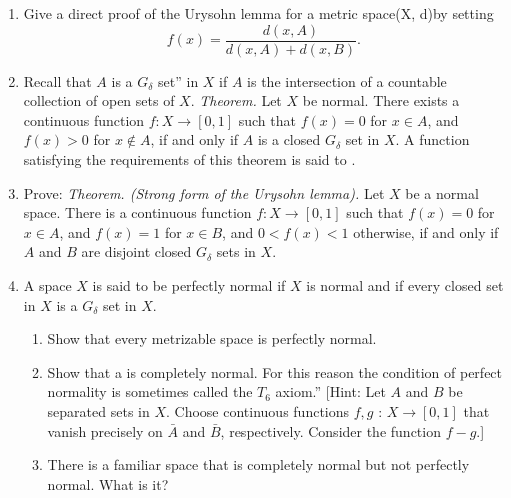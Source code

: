 \begin{enumerate}[itemsep=0.4em, parsep=0pt, topsep=0pt, partopsep=0pt, leftmargin=*, label=\arabic*., ref=\arabic*]
\begin{enumerate}[itemsep=0.2em, parsep=0pt, topsep=0pt, partopsep=0pt, leftmargin=*, label=(\alph*), align=left]
 \item Show that a connected regular space having more than one point is uncountable. ${}^{\dagger}$ \{Hint: Any countable space is Lindelöf.]
 \end{enumerate}
\item Give a direct proof of the Urysohn lemma for a metric space(X, d)by setting \[ f(x) = \frac{d( {x,A}) }{d( {x,A}) + d( {x,B}) }. \] 
\item Recall that \(A\) is a \(G_{\delta }\) set'' in \(X\) if \(A\) is the intersection of a countable collection of open sets of \(X\). \textsl{Theorem.} Let \(X\) be normal. There exists a continuous function \(f : X \rightarrow [ {0,1}]\) such that \(f(x) = 0\) for \(x \in A\), and \(f(x) > 0\) for \(x \notin A\), if and only if \(A\) is a closed \(G_{\delta }\) set in \(X\). A function satisfying the requirements of this theorem is said to .
\item Prove: \textsl{Theorem. (Strong form of the Urysohn lemma).} Let \(X\) be a normal space. There is a continuous function \(f : X \rightarrow [ {0,1}]\) such that \(f(x) = 0\) for \(x \in A\), and \(f(x) = 1\) for \(x \in B\), and \(0 < f(x) < 1\) otherwise, if and only if \(A\) and \(B\) are disjoint closed \(G_{\delta }\) sets in \(X\).
\item A space \(X\) is said to be perfectly normal if \(X\) is normal and if every closed set in \(X\) is a \(G_{\delta }\) set in \(X\).
 \begin{enumerate}[itemsep=0.2em, parsep=0pt, topsep=0pt, partopsep=0pt, leftmargin=*, label=(\alph*), align=left]
 \item Show that every metrizable space is perfectly normal.
 \item Show that a  is completely normal. For this reason the condition of perfect normality is sometimes called the \(T_{6}\) axiom.'' [Hint: Let \(A\) and \(B\) be separated sets in \(X\). Choose continuous functions \(f,g\) : \(X \rightarrow [ {0,1}]\) that vanish precisely on \(\bar{A}\) and \(\bar{B}\), respectively. Consider the function \(f - g\).]
 \item There is a familiar space that is completely normal but not perfectly normal. What is it?
 \end{enumerate}

\end{enumerate}
